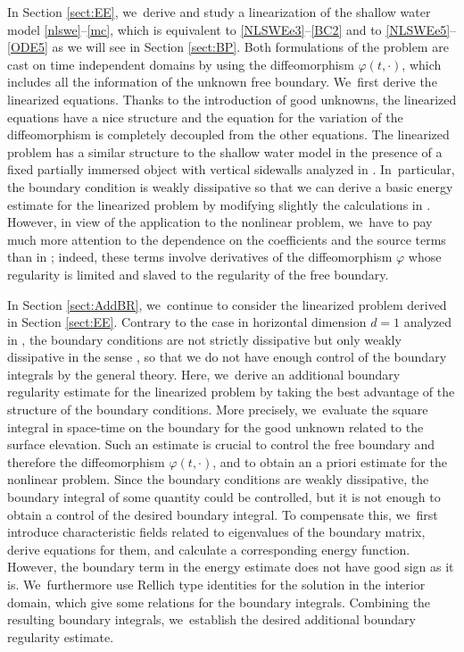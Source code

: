 \documentclass[11pt]{article}
\theoremstyle{definition}
\begin{document}
In Section \ref{sect:EE}, we~derive and study a linearization of the shallow water model \eqref{nlswe}--\eqref{mc}, which is equivalent to
\eqref{NLSWEe3}--\eqref{BC2} and to \eqref{NLSWEe5}--\eqref{ODE5} as we will see in Section \ref{sect:BP}.
Both formulations of the problem are cast on time independent domains by using the diffeomorphism $\varphi(t,\cdot)$,
which includes all the information of the unknown free boundary. We~first derive the linearized equations.
Thanks to the introduction of good unknowns, the linearized equations have a nice structure and the equation for the variation of the diffeomorphism is completely
decoupled from the other equations.
The linearized problem has a similar structure to the shallow water model in the presence of a fixed partially immersed object with vertical sidewalls
analyzed in \cite{IguchiLannes2023}. In~particular, the boundary condition is weakly dissipative so that
we can derive a basic energy estimate for the linearized problem by modifying slightly the calculations in \cite{IguchiLannes2023}.
However, in view of the application to the nonlinear problem, we~have to pay much more attention to the dependence on the coefficients and the source terms
than in \cite{IguchiLannes2023};
indeed, these terms involve derivatives of the diffeomorphism $\varphi$ whose regularity is limited and slaved to the regularity of the free boundary.

In Section \ref{sect:AddBR}, we~continue to consider the linearized problem derived in Section \ref{sect:EE}.
Contrary to the case in horizontal dimension $d=1$ analyzed in \cite{IguchiLannes2021},
the boundary conditions are not strictly dissipative but only weakly dissipative in the sense \cite{IguchiLannes2023},
so that we do not have enough control of the boundary integrals by the general theory.
Here, we~derive an additional boundary regularity estimate for the linearized problem by taking the best advantage of the structure of the boundary conditions.
More precisely, we~evaluate the square integral in space-time on the boundary for the good unknown related to the surface elevation.
Such an estimate is crucial to control the free boundary and therefore the diffeomorphism $\varphi(t,\cdot)$,
and to obtain an a priori estimate for the nonlinear problem.
Since the boundary conditions are weakly dissipative, the boundary integral of some quantity could be controlled,
but it is not enough to obtain a control of the desired boundary integral.
To compensate this, we~first introduce characteristic fields related to eigenvalues of the boundary matrix,
derive equations for them, and calculate a corresponding energy function.
However, the boundary term in the energy estimate does not have good sign as it is. We~furthermore use Rellich type identities for the solution in the interior domain, which give some relations for the boundary integrals.
Combining the resulting boundary integrals, we~establish the desired additional boundary regularity estimate.
\end{document}
